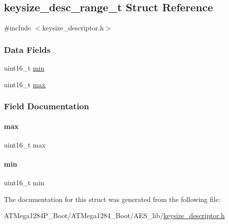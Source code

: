 \hypertarget{structkeysize__desc__range__t}{}\subsection{keysize\+\_\+desc\+\_\+range\+\_\+t Struct Reference}
\label{structkeysize__desc__range__t}


{\ttfamily \#include $<$keysize\+\_\+descriptor.\+h$>$}

\subsubsection*{Data Fields}
\begin{DoxyCompactItemize}
\item 
uint16\+\_\+t \hyperlink{structkeysize__desc__range__t_a1a1f4624f66ab0b2eb0b98316514c369}{min}
\item 
uint16\+\_\+t \hyperlink{structkeysize__desc__range__t_ac66b569507cc273bbf83ce5dd5f70e84}{max}
\end{DoxyCompactItemize}


\subsubsection{Field Documentation}
\mbox{\label{structkeysize__desc__range__t_ac66b569507cc273bbf83ce5dd5f70e84}} 
\paragraph{\texorpdfstring{max}{max}}
{\footnotesize\ttfamily uint16\+\_\+t max}

\mbox{\label{structkeysize__desc__range__t_a1a1f4624f66ab0b2eb0b98316514c369}} 
\paragraph{\texorpdfstring{min}{min}}
{\footnotesize\ttfamily uint16\+\_\+t min}



The documentation for this struct was generated from the following file\+:\begin{DoxyCompactItemize}
\item 
A\+T\+Mega1284\+P\+\_\+\+Boot/\+A\+T\+Mega1284\+\_\+\+Boot/\+A\+E\+S\+\_\+lib/\hyperlink{_a_t_mega1284_p___boot_2_a_t_mega1284___boot_2_a_e_s__lib_2keysize__descriptor_8h}{keysize\+\_\+descriptor.\+h}\end{DoxyCompactItemize}
